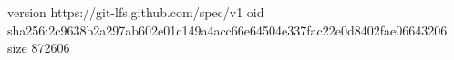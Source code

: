version https://git-lfs.github.com/spec/v1
oid sha256:2c9638b2a297ab602e01c149a4acc66e64504e337fac22e0d8402fae06643206
size 872606
